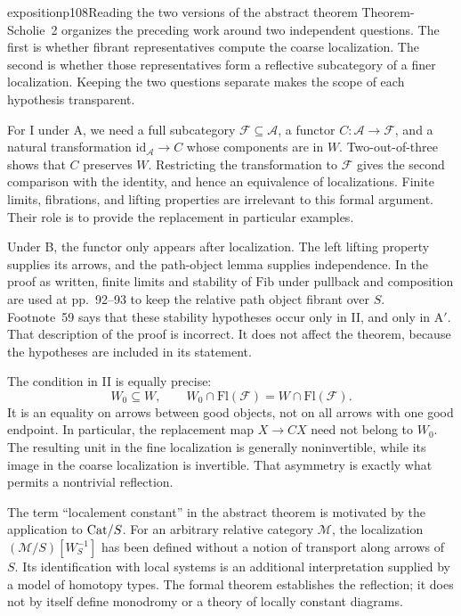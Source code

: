 \begin{dcomment}{exposition}{p108}{Reading the two versions of the abstract theorem}
Theorem-Scholie~2 organizes the preceding work around two independent questions. The first is whether fibrant representatives compute the coarse localization. The second is whether those representatives form a reflective subcategory of a finer localization. Keeping the two questions separate makes the scope of each hypothesis transparent.

For I under A, we need a full subcategory $\mathcal F\subseteq\mathcal A$, a functor $C:\mathcal A\to\mathcal F$, and a natural transformation $\mathrm{id}_{\mathcal A}\to C$ whose components are in $W$. Two-out-of-three shows that $C$ preserves $W$. Restricting the transformation to $\mathcal F$ gives the second comparison with the identity, and hence an equivalence of localizations. Finite limits, fibrations, and lifting properties are irrelevant to this formal argument. Their role is to provide the replacement in particular examples.

Under B, the functor only appears after localization. The left lifting property supplies its arrows, and the path-object lemma supplies independence. In the proof as written, finite limits and stability of $\mathrm{Fib}$ under pullback and composition are used at pp.~92--93 to keep the relative path object fibrant over $S$. Footnote~59 says that these stability hypotheses occur only in II, and only in A$'$. That description of the proof is incorrect. It does not affect the theorem, because the hypotheses are included in its statement.

The condition in II is equally precise:
\[
 W_0\subseteq W,
 \qquad W_0\cap\mathrm{Fl}(\mathcal F)
       =W\cap\mathrm{Fl}(\mathcal F).
\]
It is an equality on arrows between good objects, not on all arrows with one good endpoint. In particular, the replacement map $X\to CX$ need not belong to $W_0$. The resulting unit in the fine localization is generally noninvertible, while its image in the coarse localization is invertible. That asymmetry is exactly what permits a nontrivial reflection.

The term ``localement constant'' in the abstract theorem is motivated by the application to $\mathrm{Cat}/S$. For an arbitrary relative category $\mathcal M$, the localization $(\mathcal M/S)[W_S^{-1}]$ has been defined without a notion of transport along arrows of $S$. Its identification with local systems is an additional interpretation supplied by a model of homotopy types. The formal theorem establishes the reflection; it does not by itself define monodromy or a theory of locally constant diagrams.
\end{dcomment}


